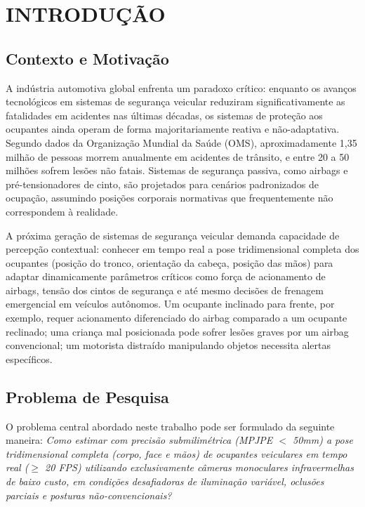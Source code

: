 \documentclass[12pt, a4paper]{article}
\begin{document}
\section{INTRODUÇÃO}

\subsection{Contexto e Motivação}

A indústria automotiva global enfrenta um paradoxo crítico: enquanto os avanços tecnológicos em sistemas de segurança veicular reduziram significativamente as fatalidades em acidentes nas últimas décadas, os sistemas de proteção aos ocupantes ainda operam de forma majoritariamente reativa e não-adaptativa. Segundo dados da Organização Mundial da Saúde (OMS), aproximadamente 1,35 milhão de pessoas morrem anualmente em acidentes de trânsito, e entre 20 a 50 milhões sofrem lesões não fatais. Sistemas de segurança passiva, como airbags e pré-tensionadores de cinto, são projetados para cenários padronizados de ocupação, assumindo posições corporais normativas que frequentemente não correspondem à realidade.

A próxima geração de sistemas de segurança veicular demanda capacidade de percepção contextual: conhecer em tempo real a pose tridimensional completa dos ocupantes (posição do tronco, orientação da cabeça, posição das mãos) para adaptar dinamicamente parâmetros críticos como força de acionamento de airbags, tensão dos cintos de segurança e até mesmo decisões de frenagem emergencial em veículos autônomos. Um ocupante inclinado para frente, por exemplo, requer acionamento diferenciado do airbag comparado a um ocupante reclinado; uma criança mal posicionada pode sofrer lesões graves por um airbag convencional; um motorista distraído manipulando objetos necessita alertas específicos.


\subsection{Problema de Pesquisa}

O problema central abordado neste trabalho pode ser formulado da seguinte maneira: \textit{Como estimar com precisão submilimétrica (MPJPE $<$ 50mm) a pose tridimensional completa (corpo, face e mãos) de ocupantes veiculares em tempo real ($\geq$ 20 FPS) utilizando exclusivamente câmeras monoculares infravermelhas de baixo custo, em condições desafiadoras de iluminação variável, oclusões parciais e posturas não-convencionais?}
\end{document}

